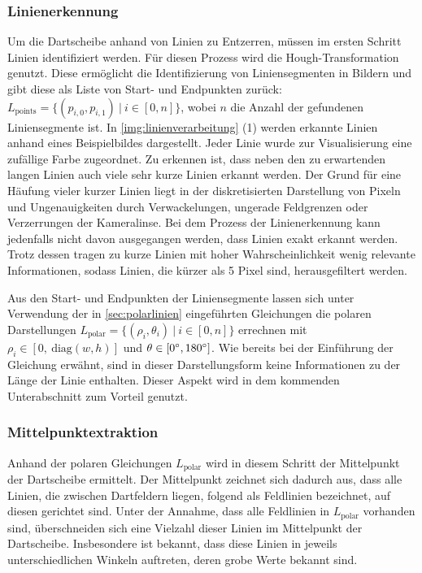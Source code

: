 \subsubsection{Linienerkennung}
\label{sec:linienerkennung}

Um die Dartscheibe anhand von Linien zu Entzerren, müssen im ersten Schritt Linien identifiziert werden. Für diesen Prozess wird die Hough-Transformation genutzt. Diese ermöglicht die Identifizierung von Liniensegmenten in Bildern und gibt diese als Liste von Start- und Endpunkten zurück: $L_\text{points} = \{(p_{i, 0}, p_{i, 1})\ |\ i \in [0, n]\}$, wobei $n$ die Anzahl der gefundenen Liniensegmente ist. In \autoref{img:linienverarbeitung} (1) werden erkannte Linien anhand eines Beispielbildes dargestellt. Jeder Linie wurde zur Visualisierung eine zufällige Farbe zugeordnet. Zu erkennen ist, dass neben den zu erwartenden langen Linien auch viele sehr kurze Linien erkannt werden. Der Grund für eine Häufung vieler kurzer Linien liegt in der diskretisierten Darstellung von Pixeln und Ungenauigkeiten durch Verwackelungen, ungerade Feldgrenzen oder Verzerrungen der Kameralinse. Bei dem Prozess der Linienerkennung kann jedenfalls nicht davon ausgegangen werden, dass Linien exakt erkannt werden. Trotz dessen tragen zu kurze Linien mit hoher Wahrscheinlichkeit wenig relevante Informationen, sodass Linien, die kürzer als 5 Pixel sind, herausgefiltert werden.

Aus den Start- und Endpunkten der Liniensegmente lassen sich unter Verwendung der in \autoref{sec:polarlinien} eingeführten Gleichungen die polaren Darstellungen $L_\text{polar} = \{(\rho_i, \theta_i)\ |\ i \in [0, n]\}$ errechnen mit $\rho_i \in [0,\ \text{diag}(w, h)]$ und $\theta \in [0^{\circ}, 180^{\circ}]$. Wie bereits bei der Einführung der Gleichung erwähnt, sind in dieser Darstellungsform keine Informationen zu der Länge der Linie enthalten. Dieser Aspekt wird in dem kommenden Unterabschnitt zum Vorteil genutzt.

\subsubsection{Mittelpunktextraktion}
\label{sec:mittelpunktextraktion}

Anhand der polaren Gleichungen $L_\text{polar}$ wird in diesem Schritt der Mittelpunkt der Dartscheibe ermittelt. Der Mittelpunkt zeichnet sich dadurch aus, dass alle Linien, die zwischen Dartfeldern liegen, folgend als Feldlinien bezeichnet, auf diesen gerichtet sind. Unter der Annahme, dass alle Feldlinien in $L_\text{polar}$ vorhanden sind, überschneiden sich eine Vielzahl dieser Linien im Mittelpunkt der Dartscheibe. Insbesondere ist bekannt, dass diese Linien in jeweils unterschiedlichen Winkeln auftreten, deren grobe Werte bekannt sind.

